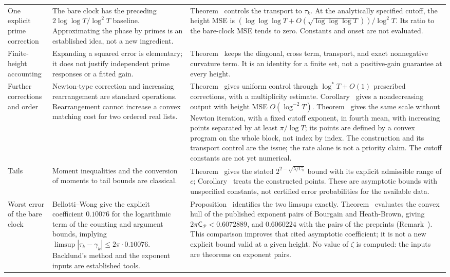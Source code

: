 \documentclass[preprint,12pt]{elsarticle}
\makeatletter
\let\CG@origref\ref
\newcommand{\CG@gettip}[1]{\@ifundefined{CGTip@#1}{Reference: #1}{\csname CGTip@#1\endcsname}}
\DeclareRobustCommand{\CGref}[1]{\pdftooltip{\CG@origref{#1}}{\CG@gettip{#1}}}
\numberwithin{equation}{section}
\theoremstyle{plain}
\theoremstyle{definition}
\theoremstyle{remark}
\makeatother
\begin{document}
\begin{longtable}{@{}p{}p{}p{}@{}}
One explicit prime correction
& The bare clock has the preceding $2\log\log T/\log^2T$ baseline. Approximating the phase by primes is an established idea, not a new ingredient.
& Theorem~\CGref{thm:computable_clock} controls the transport to $\tau_k$. At the analytically specified cutoff, the height MSE is $(\log\log\log T+O(\sqrt{\log\log\log T}))/\log^2T$. Its ratio to the bare-clock MSE tends to zero. Constants and onset are not evaluated.\\
Finite-height accounting
& Expanding a squared error is elementary; it does not justify independent prime responses or a fitted gain.
& Theorem~\CGref{thm:accounting} keeps the diagonal, cross term, transport, and exact nonnegative curvature term. It is an identity for a finite set, not a positive-gain guarantee at every height.\\
Further corrections and order
& Newton-type correction and increasing rearrangement are standard operations. Rearrangement cannot increase a convex matching cost for two ordered real lists.
& Theorem~\CGref{thm:uniform_iteration} gives uniform control through $\log^*T+O(1)$ prescribed corrections, with a multiplicity estimate. Corollary~\CGref{cor:sorted_clock} gives a nondecreasing output with height MSE $O(\log^{-2}T)$. Theorem~\CGref{thm:regularized_clock} gives the same scale without Newton iteration, with a fixed cutoff exponent, in fourth mean, with increasing points separated by at least $\pi/\log T$; its points are defined by a convex program on the whole block, not index by index. The construction and its transport control are the issue; the rate alone is not a priority claim. The cutoff constants are not yet numerical.\\
Tails
& Moment inequalities and the conversion of moments to tail bounds are classical.
& Theorem~\CGref{thm:tails} gives the stated $2^{2-\sqrt{\lambda/C_8}}$ bound with its explicit admissible range of $c$; Corollary~\CGref{cor:clock_tails} treats the constructed points. These are asymptotic bounds with unspecified constants, not certified error probabilities for the available data.\\
Worst error of the bare clock
& Bellotti--Wong \cite[Thm.~1.1, Cor.~1.5]{BellottiWong2025} give the explicit coefficient $0.10076$ for the logarithmic term of the counting and argument bounds, implying $\limsup|\tau_k-\gamma_k|\le2\pi\cdot0.10076$. Backlund's method and the exponent inputs are established tools.
& Proposition~\CGref{prop:envelope_equivalence} identifies the two limsups exactly. Theorem~\CGref{thm:envelope} evaluates the convex hull of the published exponent pairs of Bourgain and Heath-Brown, giving $2\pi \mathsf C_{\mathcal P}<0.6072889$, and $0.6060224$ with the pairs of the preprints \cite{TrudgianYang2023,TaoTrudgianYang2025} (Remark~\CGref{rem:envelope_inputs}). This comparison improves that cited asymptotic coefficient; it is not a new explicit bound valid at a given height. No value of $\zeta$ is computed: the inputs are theorems on exponent pairs.\\

\end{longtable}
\end{document}
